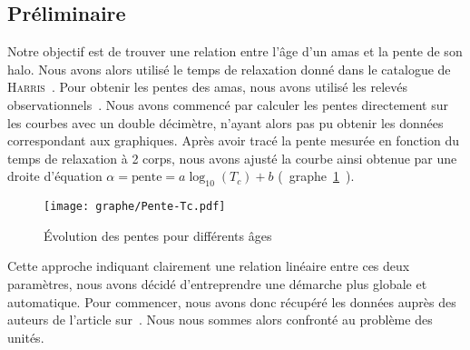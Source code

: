 \subsection{Préliminaire}
	Notre objectif est de trouver une relation entre l'âge d'un amas et la pente de son halo.
	Nous avons alors utilisé le temps de relaxation donné dans le catalogue de \textsc{Harris}~\cite{Harris}.
	Pour obtenir les pentes des amas, nous avons utilisé les relevés observationnels~\cite{Trager-graphe}. %
	Nous avons commencé par calculer les pentes directement sur les courbes avec un double décimètre, n'ayant alors pas pu obtenir les données correspondant aux graphiques.
	Après avoir tracé la pente mesurée en fonction du temps de relaxation à 2 corps, nous avons ajusté la
	courbe ainsi obtenue par une droite d'équation $ \alpha = \mathrm{pente} = a \log_{10}(T_c) + b$ (~graphe~\ref{Pente-lin}~).
	\begin{figure}[hbt!]
		\centering \texttt{[image: graphe/Pente-Tc.pdf]}
		\caption{Évolution des pentes pour différents âges}
		\label{Pente-lin}
	\end{figure}

	Cette approche indiquant clairement une relation linéaire entre ces deux paramètres, nous avons décidé d'entreprendre une démarche plus globale et automatique.
	Pour commencer, nous avons donc récupéré les données auprès des auteurs de l'article sur~\cite{TragerTable}. Nous nous sommes alors confronté au problème des unités.

